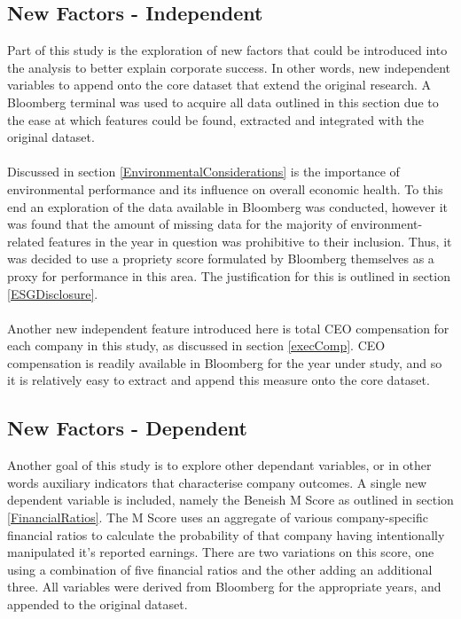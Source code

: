 \subsection{New Factors - Independent}\label{NewFactors_Independent}
{Part of this study is the exploration of new factors that could be introduced into the analysis to better explain corporate success. In other words, new independent variables to append onto the core dataset that extend the original research. A Bloomberg terminal was used to acquire all data outlined in this section due to the ease at which features could be found, extracted and integrated with the original dataset.}\\\\
{Discussed in section \ref{EnvironmentalConsiderations} is the importance of environmental performance and its influence on overall economic health. To this end an exploration of the data available in Bloomberg was conducted, however it was found that the amount of missing data for the majority of environment-related features in the year in question was prohibitive to their inclusion. Thus, it was decided to use a propriety score formulated by Bloomberg themselves as a proxy for performance in this area. The justification for this is outlined in section \ref{ESGDisclosure}.}\\\\
{Another new independent feature introduced here is total CEO compensation for each company in this study, as discussed in section \ref{execComp}. CEO compensation is readily available in Bloomberg for the year under study, and so it is relatively easy to extract and append this measure onto the core dataset.}
\subsection{New Factors - Dependent}\label{NewFactors_Dependent}
{Another goal of this study is to explore other dependant variables, or in other words auxiliary indicators that characterise company outcomes. A single new dependent variable is included, namely the Beneish M Score as outlined in section \ref{FinancialRatios}. The M Score uses an aggregate of various company-specific financial ratios to calculate the probability of that company having intentionally manipulated it's reported earnings. There are two variations on this score, one using a combination of five financial ratios and the other adding an additional three. All variables were derived from Bloomberg for the appropriate years, and appended to the original dataset.   
}
